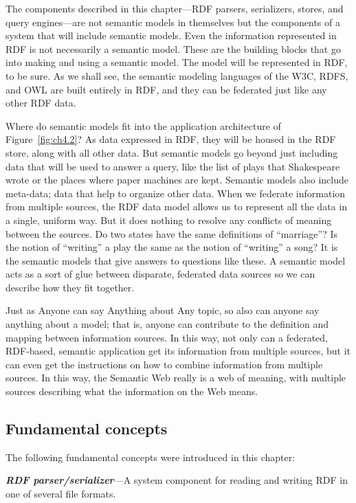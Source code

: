 The components described in this chapter---RDF parsers, serializers,
stores, and query engines---are not semantic models in themselves but
the components of a system that will include semantic models. Even the
information represented in RDF is not necessarily a semantic model.
These are the building blocks that go into making and using a semantic
model. The model will be represented in RDF, to be sure. As we shall
see, the semantic modeling languages of the W3C, RDFS, and OWL are built
entirely in RDF, and they can be federated just like any other RDF data.

Where do semantic models fit into the application architecture of Figure~\ref{fig:ch4.2}? 
As data expressed in
RDF, they will be housed in the RDF store, along with all other data.
But semantic models go beyond just including data that will be used to
answer a query, like the list of plays that Shakespeare wrote or the
places where paper machines are kept. Semantic models also include
meta-data; data that help to organize other data. When we federate
information from multiple sources, the RDF data model allows us to
represent all the data in a single, uniform way. But it does nothing to
resolve any conflicts of meaning between the sources. Do two states have
the same definitions of ``marriage''? Is the notion of ``writing'' a
play the same as the notion of ``writing'' a song? It is the semantic
models that give answers to questions like these. A semantic model acts
as a sort of glue between disparate, federated data sources so we can
describe how they fit together.

Just as Anyone can say Anything about Any topic, so also can anyone say
anything about a model; that is, anyone can contribute to the definition
and mapping between information sources. In this way, not only can a
federated, RDF-based, semantic application get its information from
multiple sources, but it can even get the instructions on how to combine
information from multiple sources. In this way, the Semantic Web really
is a web of meaning, with multiple sources describing what the
information on the Web means.

\subsection{Fundamental concepts}

The following fundamental concepts were introduced in this chapter:

\emph{\textbf{RDF parser/serializer}}---A system component for reading and writing RDF
in one of several file formats.

